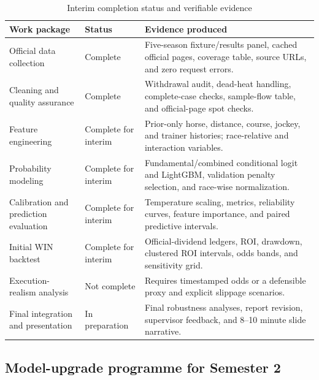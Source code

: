 \begin{table}[htbp]
\centering
\caption{Interim completion status and verifiable evidence}\label{tab:completion}
\small
\begin{tabularx}{\textwidth}{L{4.0cm} L{2.2cm} Y}
\toprule
\textbf{Work package} & \textbf{Status} & \textbf{Evidence produced} \\
\midrule
Official data collection & Complete & Five-season fixture/results panel, cached official pages, coverage table, source URLs, and zero request errors. \\
Cleaning and quality assurance & Complete & Withdrawal audit, dead-heat handling, complete-case checks, sample-flow table, and official-page spot checks. \\
Feature engineering & Complete for interim & Prior-only horse, distance, course, jockey, and trainer histories; race-relative and interaction variables. \\
Probability modeling & Complete for interim & Fundamental/combined conditional logit and LightGBM, validation penalty selection, and race-wise normalization. \\
Calibration and prediction evaluation & Complete for interim & Temperature scaling, metrics, reliability curves, feature importance, and paired predictive intervals. \\
Initial WIN backtest & Complete for interim & Official-dividend ledgers, ROI, drawdown, clustered ROI intervals, odds bands, and sensitivity grid. \\
Execution-realism analysis & Not complete & Requires timestamped odds or a defensible proxy and explicit slippage scenarios. \\
Final integration and presentation & In preparation & Final robustness analyses, report revision, supervisor feedback, and 8--10 minute slide narrative. \\
\bottomrule
\end{tabularx}
\end{table}

\subsection{Model-upgrade programme for Semester 2}\label{sec:plan-analysis}

